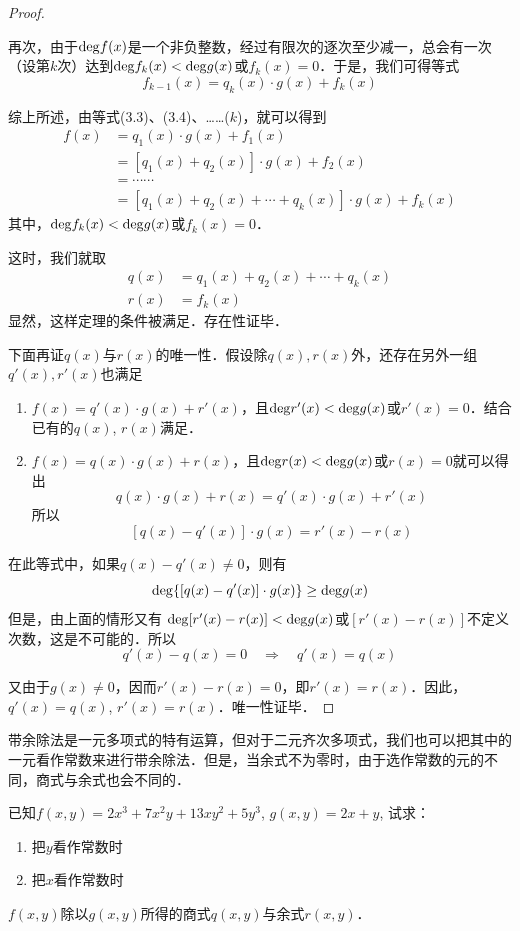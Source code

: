 \begin{proof}
\begin{enumerate}
再次，由于${\rm deg}f(x)$是一个非负整数，经过有限次的逐次至少减一，总会有一次（设第$k$次）达到${\rm deg}f_k(x)<{\rm deg}g(x)$或$f_k(x)=0$．于是，我们可得等式
\begin{equation*}
    f_{k-1}(x)=q_k(x)\cdot g(x)+f_k(x) \tag{$k$}
\end{equation*}

综上所述，由等式(3.3)、(3.4)、……($k$)，就可以得到
\[\begin{split}
   f(x)&=q_1(x)\cdot g(x)+f_1(x)\\
   &=[q_1(x)+q_2(x)]\cdot g(x)+f_2(x)\\ 
&=\cdots\cdots\\
&=[q_1(x)+q_2(x)+\cdots+q_k(x)]\cdot g(x)+f_k(x)
\end{split}\]
其中，${\rm deg}f_k(x)<{\rm deg}g(x)$或$f_k(x)=0$．

这时，我们就取
\[\begin{split}
    q(x)&=q_1(x)+q_2(x)+\cdots +q_k(x)\\
    r(x)&=f_k(x)
\end{split}\]
显然，这样定理的条件被满足．存在性证毕．
\end{enumerate}

下面再证$q(x)$与$r(x)$的唯一性．假设除$q(x),r(x)$外，还存在另外一组$q'(x),r'(x)$也满足
\begin{enumerate}
    \item $f(x)=q'(x)\cdot g(x)+r'(x)$，且${\rm deg}r'(x)<{\rm deg}g(x)$或$r'(x)=0$．结合已有的$q(x)$, $r(x)$满足．
    \item $f(x)=q(x)\cdot g(x)+r(x)$，且${\rm deg}r(x)<{\rm deg}g(x)$或$r(x)=0$就可以得出
\[q(x)\cdot g(x)+r(x)=q'(x)\cdot g(x)+r'(x)\]
所以
\[[q(x)-q'(x)]\cdot g(x)=r'(x)-r(x)\]
\end{enumerate}

在此等式中，如果$q(x)-q'(x)\ne 0$，则有
\[{\rm deg}\{[q(x)-q'(x)]\cdot g(x)\}\ge {\rm deg}g(x)\]
但是，由上面的情形又有
${\rm deg}[r'(x)-r(x)]<{\rm deg}g(x)$或$[r'(x)-r(x)]$不定义次数，这是不可能的．所以
\[q'(x)-q(x)=0\quad \Rightarrow\quad q'(x)=q(x)\]

又由于$g(x)\ne 0$，因而$r'(x)-r(x)=0$，即$r'(x)=r(x)$．因此，$q'(x)=q(x)$, $r'(x)=r(x)$．唯一性证毕．
\end{proof}

带余除法是一元多项式的特有运算，但对于二元齐次多项式，我们也可以把其中的一元看作常数来进行带余除法．但是，当余式不为零时，由于选作常数的元的不同，商式与余式也会不同的．

\begin{example}
 已知$f(x,y)=2x^3+7x^2y+13xy^2+5y^3$, $g(x,y)=2x+y$, 试求：
 \begin{enumerate}
     \item 把$y$看作常数时
     \item 把$x$看作常数时
 \end{enumerate}
$f(x,y)$除以$g(x,y)$所得的商式$q(x,y)$与余式$r(x,y)$．
\end{example}

